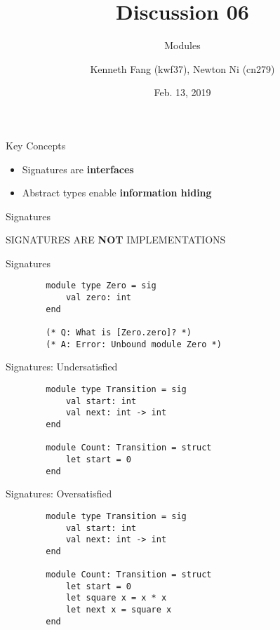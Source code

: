 \documentclass{beamer}
\title{Discussion 06}
\subtitle{Modules}
\author{Kenneth Fang (kwf37), Newton Ni (cn279)}
\date{Feb. 13, 2019}
\begin{document}
    \begin{frame}
        \titlepage{}
    \end{frame}

    \begin{frame}{Key Concepts}
        \begin{itemize}
            \item<1-> Signatures are \textbf{interfaces}
            \item<2-> Abstract types enable \textbf{information hiding}
        \end{itemize}
    \end{frame}

    \begin{frame}{Signatures}

        \centering
        {\Large SIGNATURES ARE \textbf{NOT} IMPLEMENTATIONS}

    \end{frame}

    \begin{frame}[fragile=singleslide]{Signatures}
        \begin{verbatim}
        module type Zero = sig
            val zero: int
        end

        (* Q: What is [Zero.zero]? *)
        (* A: Error: Unbound module Zero *)
        \end{verbatim}
    \end{frame}

    \begin{frame}[fragile=singleslide]{Signatures: Undersatisfied}
        \begin{verbatim}
        module type Transition = sig
            val start: int
            val next: int -> int
        end

        module Count: Transition = struct
            let start = 0
        end
        \end{verbatim}
    \end{frame}

    \begin{frame}[fragile=singleslide]{Signatures: Oversatisfied}
        \begin{verbatim}
        module type Transition = sig
            val start: int
            val next: int -> int
        end

        module Count: Transition = struct
            let start = 0
            let square x = x * x
            let next x = square x
        end
        \end{verbatim}
    \end{frame}
\end{document}
